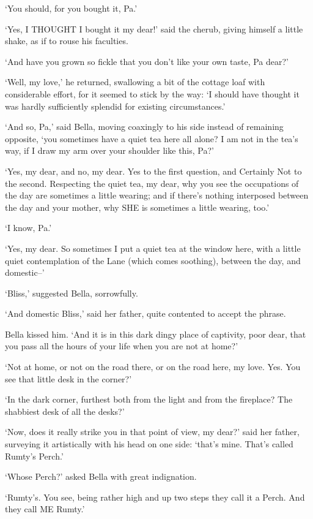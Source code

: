 ‘You should, for you bought it, Pa.’

‘Yes, I THOUGHT I bought it my dear!’ said the cherub, giving himself a
little shake, as if to rouse his faculties.

‘And have you grown so fickle that you don’t like your own taste, Pa
dear?’

‘Well, my love,’ he returned, swallowing a bit of the cottage loaf with
considerable effort, for it seemed to stick by the way: ‘I should have
thought it was hardly sufficiently splendid for existing circumstances.’

‘And so, Pa,’ said Bella, moving coaxingly to his side instead of
remaining opposite, ‘you sometimes have a quiet tea here all alone? I
am not in the tea’s way, if I draw my arm over your shoulder like this,
Pa?’

‘Yes, my dear, and no, my dear. Yes to the first question, and Certainly
Not to the second. Respecting the quiet tea, my dear, why you see the
occupations of the day are sometimes a little wearing; and if there’s
nothing interposed between the day and your mother, why SHE is sometimes
a little wearing, too.’

‘I know, Pa.’

‘Yes, my dear. So sometimes I put a quiet tea at the window here, with
a little quiet contemplation of the Lane (which comes soothing), between
the day, and domestic--’

‘Bliss,’ suggested Bella, sorrowfully.

‘And domestic Bliss,’ said her father, quite contented to accept the
phrase.

Bella kissed him. ‘And it is in this dark dingy place of captivity,
poor dear, that you pass all the hours of your life when you are not at
home?’

‘Not at home, or not on the road there, or on the road here, my love.
Yes. You see that little desk in the corner?’

‘In the dark corner, furthest both from the light and from the
fireplace? The shabbiest desk of all the desks?’

‘Now, does it really strike you in that point of view, my dear?’ said
her father, surveying it artistically with his head on one side: ‘that’s
mine. That’s called Rumty’s Perch.’

‘Whose Perch?’ asked Bella with great indignation.

‘Rumty’s. You see, being rather high and up two steps they call it a
Perch. And they call ME Rumty.’

